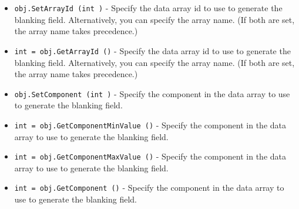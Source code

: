 \begin{itemize}
\item  \verb|obj.SetArrayId (int )| -  Specify the data array id to use to generate the blanking
 field. Alternatively, you can specify the array name. (If both are set,
 the array name takes precedence.)

\item  \verb|int = obj.GetArrayId ()| -  Specify the data array id to use to generate the blanking
 field. Alternatively, you can specify the array name. (If both are set,
 the array name takes precedence.)

\item  \verb|obj.SetComponent (int )| -  Specify the component in the data array to use to generate the blanking
 field.

\item  \verb|int = obj.GetComponentMinValue ()| -  Specify the component in the data array to use to generate the blanking
 field.

\item  \verb|int = obj.GetComponentMaxValue ()| -  Specify the component in the data array to use to generate the blanking
 field.

\item  \verb|int = obj.GetComponent ()| -  Specify the component in the data array to use to generate the blanking
 field.

\end{itemize}
